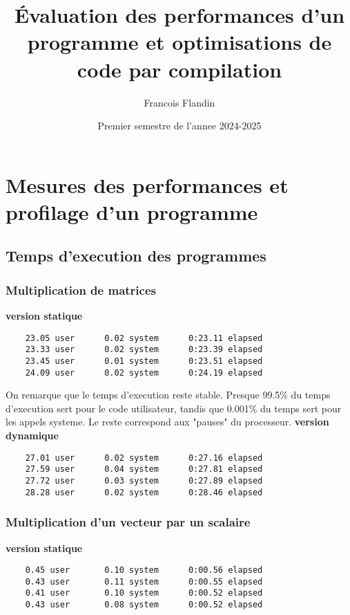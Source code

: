 \documentclass{rapport}
\title{Évaluation des performances d’un programme et optimisations de
code par compilation}
\author{Francois Flandin}
\date{Premier semestre de l'annee 2024-2025}
\begin{document}
  \maketitle

  \clearpage
  \tableofcontents

  \clearpage

  \section{Mesures des performances et profilage d’un programme}
  
  \subsection{Temps d'execution des programmes}

  \subsubsection{Multiplication de matrices}
  \textbf{version statique}
  \begin{lstlisting}
    23.05 user      0.02 system      0:23.11 elapsed
    23.33 user      0.02 system      0:23.39 elapsed
    23.45 user      0.01 system      0:23.51 elapsed
    24.09 user      0.02 system      0:24.19 elapsed
  \end{lstlisting}
  On remarque que le temps d'execution reste stable. 
  Presque 99.5\% du temps d'execution sert pour le code utilisateur, tandis que 0.001\% du temps sert pour les appels systeme. 
  Le reste correspond aux "pauses" du processeur.
  \newline
  \newline
  \textbf{version dynamique}
  \begin{lstlisting}
    27.01 user      0.02 system      0:27.16 elapsed
    27.59 user      0.04 system      0:27.81 elapsed
    27.72 user      0.03 system      0:27.89 elapsed
    28.28 user      0.02 system      0:28.46 elapsed
  \end{lstlisting}

  \subsubsection{Multiplication d'un vecteur par un scalaire}
  \textbf{version statique}
  \begin{lstlisting}
    0.45 user       0.10 system      0:00.56 elapsed
    0.43 user       0.11 system      0:00.55 elapsed
    0.41 user       0.10 system      0:00.52 elapsed
    0.43 user       0.08 system      0:00.52 elapsed
  \end{lstlisting}
\end{document}

